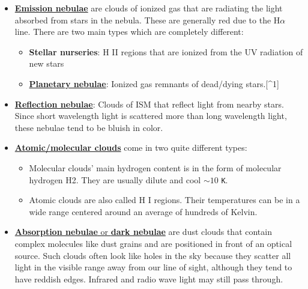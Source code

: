 \documentclass[11pt]{article}
\providecommand{\tightlist}{%
      \setlength{\itemsep}{0pt}\setlength{\parskip}{0pt}}
\begin{document}
\begin{itemize}
\tightlist
\item
  \href{https://en.wikipedia.org/wiki/Emission_nebula}{\textbf{Emission
  nebulae}} are clouds of ionized gas that are radiating the light
  absorbed from stars in the nebula. These are generally red due to the
  H\(\alpha\) line. There are two main types which are completely
  different:

  \begin{itemize}
  \tightlist
  \item
    \textbf{Stellar nurseries}: H II regions that are ionized from the
    UV radiation of new stars\\
  \item
    \href{https://en.wikipedia.org/wiki/Planetary_nebula}{\textbf{Planetary
    nebulae}}: Ionized gas remnants of dead/dying stars.{[}\^{}1{]}\\
  \end{itemize}
\item
  \href{https://en.wikipedia.org/wiki/Reflection_nebula}{\textbf{Reflection
  nebulae}}: Clouds of ISM that reflect light from nearby stars. Since
  short wavelength light is scattered more than long wavelength light,
  these nebulae tend to be bluish in color.
\item
  \href{https://en.wikipedia.org/wiki/Molecular_cloud}{\textbf{Atomic/molecular
  clouds}} come in two quite different types:

  \begin{itemize}
  \tightlist
  \item
    Molecular clouds' main hydrogen content is in the form of molecular
    hydrogen H2. They are usually dilute and cool \(\sim 10\)
    \texttt{K}.
  \item
    Atomic clouds are also called H I regions. Their temperatures can be
    in a wide range centered around an average of hundreds of Kelvin.
  \end{itemize}
\item
  \href{https://en.wikipedia.org/wiki/Dark_nebula}{\textbf{Absorption
  nebulae} or \textbf{dark nebulae}} are dust clouds that contain
  complex molecules like dust grains and are positioned in front of an
  optical source. Such clouds often look like holes in the sky because
  they scatter all light in the visible range away from our line of
  sight, although they tend to have reddish edges. Infrared and radio
  wave light may still pass through.
\end{itemize}
\end{document}
